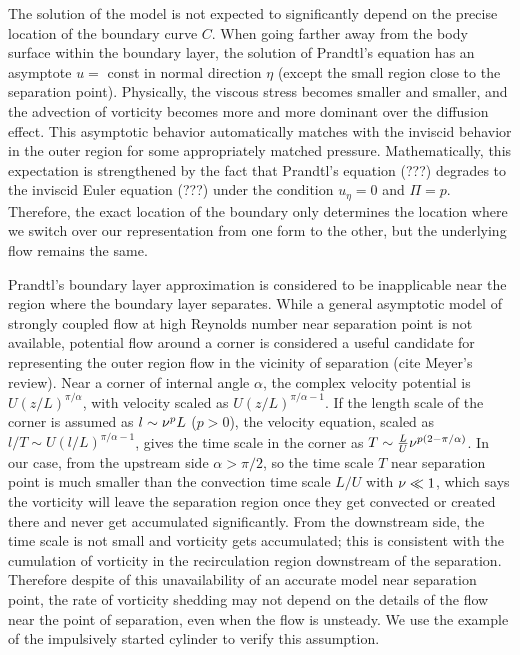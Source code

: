 The solution of the model is not expected to significantly depend on the precise location of the boundary curve $C$.
When going farther away from the body surface within the boundary layer, the solution of Prandtl's equation has an asymptote $u = $ const in normal direction $\eta$ (except the small region close to the separation point).
Physically, the viscous stress becomes smaller and smaller, and the advection of vorticity becomes more and more dominant over the diffusion effect.
This asymptotic behavior automatically matches with the inviscid behavior in the outer region for some appropriately matched pressure.
Mathematically, this expectation is strengthened by the fact that Prandtl's equation (???) degrades to the inviscid Euler equation (???) under the condition $u_\eta = 0$ and $\Pi = p$.
Therefore, the exact location of the boundary only determines the location where we switch over our representation from one form to the other, but the underlying flow remains the same.

Prandtl's boundary layer approximation is considered to be inapplicable near the region where the boundary layer separates. 
While a general asymptotic model of strongly coupled flow at high Reynolds number near separation point is not available, potential flow around a corner is considered a useful candidate for representing the outer region flow in the vicinity of separation (cite Meyer's review).
Near a corner of internal angle $\alpha$, the complex velocity potential is $U (z/L)^{\pi/\alpha}$, with velocity scaled as $U (z/L)^{\pi/\alpha-1}$.
If the length scale of the corner is assumed as $l \sim \nu^p L$ ($p > 0$), the velocity equation, scaled as $l/T \sim U(l/L)^{\pi/\alpha-1}$, gives the time scale in the corner as $T \sim \frac{L}{U} \nu^{p(2-\pi/\alpha)}$. 
In our case, from the upstream side $\alpha > \pi/2$, so the time scale $T$ near separation point is much smaller than the convection time scale $L/U$ with $\nu \ll 1$, which says the vorticity will leave the separation region once they get convected or created there and never get accumulated significantly. 
From the downstream side, the time scale is not small and vorticity gets accumulated; this is consistent with the cumulation of vorticity in the recirculation region downstream of the separation.
Therefore despite of this unavailability of an accurate model near separation point, the rate of vorticity shedding may not depend on the details of the flow near the point of separation, even when the flow is unsteady. 
We use the example of the impulsively started cylinder to verify this assumption.
